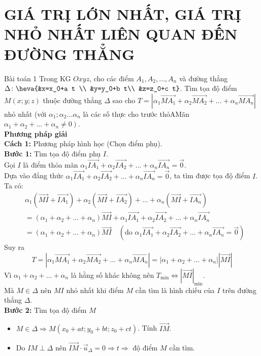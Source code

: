 \section{GIÁ TRỊ LỚN NHẤT, GIÁ TRỊ NHỎ NHẤT LIÊN QUAN ĐẾN ĐƯỜNG THẲNG}
\begin{dang}{Bài toán 1}
Trong KG $Oxyz$, cho các điểm $A_1, A_2, \ldots, A_n$ và đường thẳng
$\Delta\colon\heva{&x=x_0+a t \\ &y=y_0+b t\\ &z=z_0+c t}$.
Tìm tọa độ điểm $M(x ; y ; z)$ thuộc đường thẳng $\Delta$ sao cho
$T=\left|\alpha_1 \vec{MA_1}+\alpha_2 \vec{MA_2}+\ldots+\alpha_n \vec{MA_n}\right|$ nhỏ nhất (với $\alpha_1 ; \alpha_2 \ldots \alpha_n$ là các số thực cho trước thỏAMãn $\left.\alpha_1+\alpha_2+\ldots+\alpha_n \neq 0\right)$.
\\
\textbf{Phương pháp giải}
\\
\textbf{Cách 1:} Phương pháp hình học (Chọn điểm phụ).
\\
\textbf{Bước 1:} Tìm tọa độ điểm phụ $I$.
\\
Gọi $I$ là điểm thỏa mãn $\alpha_1 \vec{IA_1}+\alpha_2 \vec{IA_2}+\ldots+\alpha_n \vec{IA_n}=\vec{0}$.
\\
Dựa vào đẳng thức
$\alpha_1 \vec{IA_1}+\alpha_2 \vec{IA_2}+\ldots+\alpha_n \vec{IA_n}=\vec{0}$,
ta tìm được tọa độ điểm $I$.
Ta có:
\begin{align*}
	&\alpha_1\left(\vec{MI}+\vec{IA_1}\right)+\alpha_2\left(\vec{MI}+\vec{IA_2}\right)+\ldots+\alpha_n\left(\vec{MI}+\vec{IA_n}\right)\\
	&= \left(\alpha_1+\alpha_2+\ldots+\alpha_n\right) \vec{MI}+\alpha_1 \vec{IA_1}+\alpha_2 \vec{IA_2}+\ldots+\alpha_n \vec{IA_n} \\
	&= \left(\alpha_1+\alpha_2+\ldots+\alpha_n\right) \vec{MI} \quad \left(\text {do } \alpha_1 \vec{IA_1}+\alpha_2 \vec{IA_2}+\ldots+\alpha_n \vec{IA_n}=\vec{0}\right) 
\end{align*}
Suy ra
$$
	T=\left|\alpha_1 \vec{MA_1}+\alpha_2 \vec{MA_2}+\ldots+\alpha_n \vec{MA_n}\right|=\left|\alpha_1+\alpha_2+\ldots+\alpha_n\right||\vec{MI}|
$$
Vì $\alpha_1+\alpha_2+\ldots+\alpha_n$ là hằng số khác không nên $T_{\min } \Leftrightarrow|\vec{MI}|_{\min }$.
\\
Mà $M \in \Delta$ nên $MI$ nhỏ nhất khi điểm $M$ cần tìm là hình chiếu của $I$ trên đường thẳng $\Delta$.
\\
\textbf{Bước 2:} Tìm tọa độ điểm $M$
\begin{itemize}
	\item $M \in \Delta \Rightarrow M\left(x_0+a t ; y_0+b t ; z_0+c t\right)$. Tính $\vec{I M}$.
	\item Do $I M \perp \Delta$ nên $\vec{I M} \cdot \vec{u}_{\Delta}=0 \Rightarrow t \Rightarrow$ độ điểm $M$ cần tìm.
\end{itemize}


\end{dang}
